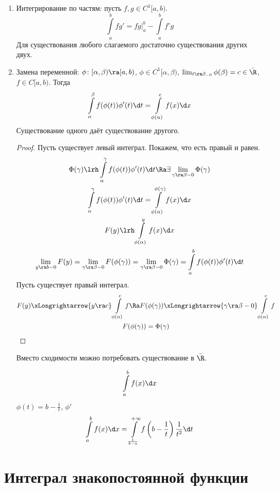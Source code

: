 \begin{enumerate}
\item
	Интегрирование по частям: пусть $f, g \in C^1[a,b)$.
	\[ \int\limits_a^b fg' = fg \biggr|_a^b - \int\limits_a^b f'g \]
	Для существования любого слагаемого достаточно существования других двух.

\item
	Замена переменной: $\phi\colon [\alpha, \beta) \ra [a, b)$, $\phi \in C^1[\alpha, \beta)$, $\lim_{t\ra\beta_{-0}} \phi(\beta) = c \in \bar \R$,
	$f \in C[a, b)$.
	Тогда
	\[ \int\limits_\alpha^\beta f(\phi(t)) \phi'(t) \d t = \int\limits_{\phi(\alpha)}^c f(x) \d x \]
	Существование одного даёт существование другого.
	\begin{proof}
		Пусть существует левый интеграл.
		Покажем, что есть правый и равен.
		\begin{gather*}
			\Phi(\gamma) \lrh \int\limits_\alpha^\gamma f(\phi(t)) \phi'(t) \d t \Ra \exists \lim_{\gamma\ra\beta-0} \Phi(\gamma) \\
			\int\limits_\alpha^\gamma f(\phi(t)) \phi'(t) \d t = \int\limits_{\phi(\alpha)}^{\phi(\gamma)} f(x) \d x \\
			F(y) \lrh \int\limits_{\phi(\alpha)}^y f(x) \d x \\
			\lim_{y\ra b-0} F(y) = \lim_{\gamma\ra\beta-0} F(\phi(\gamma))
			= \lim_{\gamma\ra\beta-0} \Phi(\gamma) = \int\limits_a^b f(\phi(t)) \phi'(t) \d t
		\end{gather*}
		Пусть существует правый интеграл.
		\begin{gather*}
			F(y) \xLongrightarrow{y\ra c} \int\limits_{\phi(\alpha)}^c f
			\Ra F(\phi(\gamma)) \xLongrightarrow{\gamma\ra\beta-0} \int\limits_{\phi(\alpha)}^c f \\
			F(\phi(\gamma)) = \Phi(\gamma)
		\end{gather*}
	\end{proof}
	
	\begin{Rem}
		Вместо сходимости можно потребовать существование в $\bar \R$.
	\end{Rem}

	\begin{Rem}
		\[ \int\limits_a^b f(x) \d x \]
		$\phi(t) = b - \frac1t$, $\phi'$
		\[ \int\limits_a^b f(x) \d x = \int\limits_{\frac1{b-a}}^{+\infty} f\left(b - \frac1t\right)\frac1{t^2} \d t \]
	\end{Rem}
\end{enumerate}

\section{Интеграл знакопостоянной функции}

